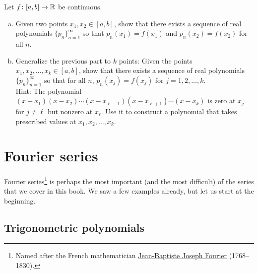 \begin{exercise} \label{exercise:finitelymanyweierequal}
\pagebreak[2]
Let $f \colon [a,b] \to {\mathbb{R}}$ be continuous.
\begin{enumerate}[a)]
\item
Given two points $x_1,x_2 \in [a,b]$, show that
there exists a sequence of real polynomials $\{ p_n \}_{n=1}^\infty$
so that $p_n(x_1) = f(x_1)$ and $p_n(x_2) = f(x_2)$ for all $n$.
\item
Generalize the previous part to $k$ points:
Given the points $x_1,x_2,\ldots,x_k \in [a,b]$, show that
there exists a sequence of real polynomials $\{ p_n \}_{n=1}^\infty$
so that for all $n$, $p_n(x_j) = f(x_j)$ for $j=1,2,\ldots,k$.
\\
Hint: The polynomial $(x-x_1)(x-x_2)\cdots(x-x_{\ell-1})(x-x_{\ell+1})
\cdots(x-x_k)$ is zero at $x_j$ for $j\not=\ell$ but nonzero at
$x_\ell$.  Use it to construct a polynomial that takes prescribed values
at $x_1,x_2,\ldots,x_k$.
\end{enumerate}
\end{exercise}


\sectionnewpage
\section{Fourier series}
\label{sec:fourier}



Fourier series\footnote{%
Named after the French mathematician
\href{https://en.wikipedia.org/wiki/Joseph_Fourier}{Jean-Baptiste Joseph Fourier}
(1768--1830).} is perhaps the most important (and the most difficult)
of the series that we cover in
this book.  We saw a few examples already,
but let us start
at the beginning.

\subsection{Trigonometric polynomials}

